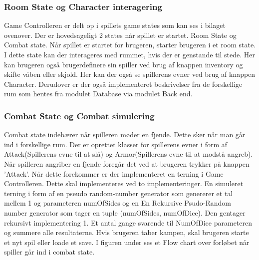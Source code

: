 \subsubsection{Room State og Character interagering}
Game Controlleren er delt op i spillets game states som kan ses i bilaget ovenover. Der er hovedsageligt 2 states når spillet er startet. Room State og Combat state. Når spillet er startet for brugeren, starter brugeren i et room state. I dette state kan der interageres med rummet, hvis der er genstande til stede. Her kan brugeren også brugerdefinere sin spiller ved brug af knappen inventory og skifte våben eller skjold. Her kan der også se spillerens evner ved brug af knappen Character. Derudover er der også implementeret beskrivelser fra de forskellige rum som hentes fra modulet Database via modulet Back end.
\subsubsection{Combat State og Combat simulering}
Combat state indebærer når spilleren møder en fjende. Dette sker når man går ind i forskellige rum. Der er oprettet klasser for spillerens evner i form af Attack(Spillerens evne til at slå) og Armor(Spillerens evne til at modstå angreb). Når spilleren angriber en fjende foregår det ved at brugeren trykker på knappen ’Attack’. Når dette forekommer er der implementeret en terning i Game Controlleren. Dette skal implementeres ved to implementeringer. En simuleret terning i form af en pseudo random-number generator som genererer et tal mellem 1 og parameteren numOfSides og en  En Rekursive Psudo-Random number generator som tager en tuple (numOfSides, numOfDice). Den gentager rekursivt implementering 1. Et antal gange svarende til NumOfDice parameteren og summere alle resultaterne.  Hvis brugeren taber kampen, skal brugeren starte et nyt spil eller loade et save. I figuren under ses et Flow chart over forløbet når spiller går ind i combat state.
